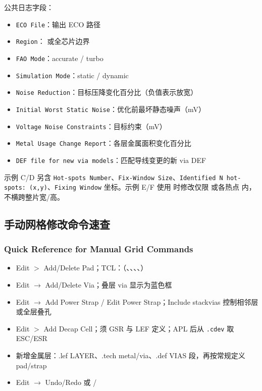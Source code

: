 公共日志字段：
\begin{itemize}
  \item \texttt{ECO File}：输出 ECO 路径
  \item \texttt{Region}： 或全芯片边界
  \item \texttt{FAO Mode}：accurate / turbo
  \item \texttt{Simulation Mode}：static / dynamic
  \item \texttt{Noise Reduction}：目标压降变化百分比（负值表示放宽）
  \item \texttt{Initial Worst Static Noise}：优化前最坏静态噪声（mV）
  \item \texttt{Voltage Noise Constraints}：目标约束（mV）
  \item \texttt{Metal Usage Change Report}：各层金属面积变化百分比
  \item \texttt{DEF file for new via models}：匹配导线变更的新 via DEF
\end{itemize}

示例 C/D 另含 \texttt{Hot-spots Number}、\texttt{Fix-Window Size}、\texttt{Identified N hot-spots: (x,y)}、\texttt{Fixing Window} 坐标。示例 E/F 使用  时修改仅限  或各热点  内，不横跨整片宽/高。

\subsection{手动网格修改命令速查}
\subsubsection*{Quick Reference for Manual Grid Commands}

\begin{itemize}
  \item Edit $>$ Add/Delete Pad；TCL：（、、、、）
  \item Edit $\rightarrow$ Add/Delete Via；叠层 via 显示为蓝色框
  \item Edit $\rightarrow$ Add Power Strap / Edit Power Strap；Include stackvias 控制相邻层或全层叠孔
  \item Edit $>$ Add Decap Cell；须 GSR  与 LEF 定义；APL 后从 \texttt{.cdev} 取 ESC/ESR
  \item 新增金属层：.lef LAYER、.tech metal/via、.def VIAS 段，再按常规定义 pad/strap
  \item Edit $\rightarrow$ Undo/Redo 或 /
\end{itemize}

